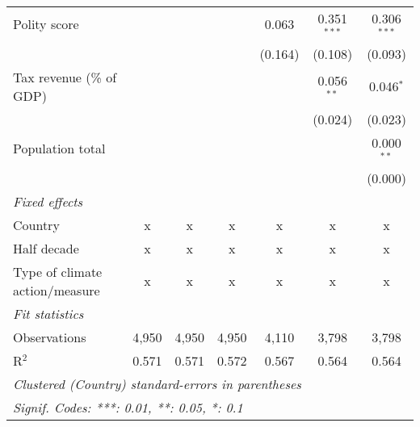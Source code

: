 \begin{tabular}{lcccccc}
   Polity score                                                &         &              &                & 0.063          & 0.351$^{***}$  & 0.306$^{***}$\\   
                                                               &         &              &                & (0.164)        & (0.108)        & (0.093)\\   
   Tax revenue (\% of GDP)                                     &         &              &                &                & 0.056$^{**}$   & 0.046$^{*}$\\   
                                                               &         &              &                &                & (0.024)        & (0.023)\\   
   Population total                                            &         &              &                &                &                & 0.000$^{**}$\\   
                                                               &         &              &                &                &                & (0.000)\\   
   \emph{Fixed effects}\\
   Country                                                     & x       & x            & x              & x              & x              & x\\  
   Half decade                                                 & x       & x            & x              & x              & x              & x\\  
   Type of climate action/measure                              & x       & x            & x              & x              & x              & x\\  
   \midrule \emph{Fit statistics}\\
   Observations                                                & 4,950   & 4,950        & 4,950          & 4,110          & 3,798          & 3,798\\  
   R$^2$                                                       & 0.571   & 0.571        & 0.572          & 0.567          & 0.564          & 0.564\\  
   \midrule
   \multicolumn{7}{l}{\emph{Clustered (Country) standard-errors in parentheses}}\\
   \multicolumn{7}{l}{\emph{Signif. Codes: ***: 0.01, **: 0.05, *: 0.1}}\\
\end{tabular}
\par\endgroup


